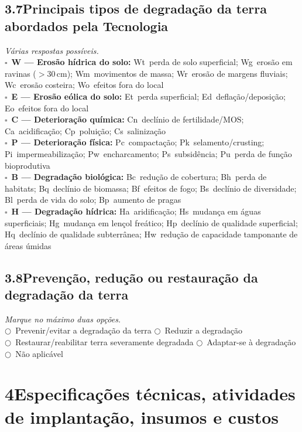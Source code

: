 \subsection{3.7\quad Principais tipos de degradação da terra abordados pela Tecnologia}
\textit{Várias respostas possíveis.}\\[4pt]
$\square$~\textbf{W --- Erosão hídrica do solo:} Wt~perda de solo superficial; Wg~erosão em ravinas ($>$30\,cm); Wm~movimentos de massa; Wr~erosão de margens fluviais; Wc~erosão costeira; Wo~efeitos fora do local\\
$\square$~\textbf{E --- Erosão eólica do solo:} Et~perda superficial; Ed~deflação/deposição; Eo~efeitos fora do local\\
$\square$~\textbf{C --- Deterioração química:} Cn~declínio de fertilidade/MOS; Ca~acidificação; Cp~poluição; Cs~salinização\\
$\square$~\textbf{P --- Deterioração física:} Pc~compactação; Pk~selamento/crusting; Pi~impermeabilização; Pw~encharcamento; Ps~subsidência; Pu~perda de função bioprodutiva\\
$\square$~\textbf{B --- Degradação biológica:} Bc~redução de cobertura; Bh~perda de habitats; Bq~declínio de biomassa; Bf~efeitos de fogo; Bs~declínio de diversidade; Bl~perda de vida do solo; Bp~aumento de pragas\\
$\square$~\textbf{H --- Degradação hídrica:} Ha~aridificação; Hs~mudança em águas superficiais; Hg~mudança em lençol freático; Hp~declínio de qualidade superficial; Hq~declínio de qualidade subterrânea; Hw~redução de capacidade tamponante de áreas úmidas

\subsection{3.8\quad Prevenção, redução ou restauração da degradação da terra}
\textit{Marque no máximo duas opções.}\\[4pt]
$\bigcirc$~Prevenir/evitar a degradação da terra \quad $\bigcirc$~Reduzir a degradação\\
$\bigcirc$~Restaurar/reabilitar terra severamente degradada \quad $\bigcirc$~Adaptar-se à degradação\\
$\bigcirc$~Não aplicável

\section{4\quad Especificações técnicas, atividades de implantação, insumos e custos}

